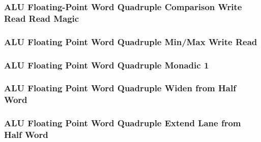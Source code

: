 \subsubsection[{\small ALU Floating-Point Word Quadruple Comparison Write Read Read Magic}]{ALU Floating-Point Word Quadruple Comparison Write Read Read Magic} \label{sec:format-ALU-FWQCWRR.M}



\subsubsection[{\small ALU Floating Point Word Quadruple Min/Max Write Read}]{ALU Floating Point Word Quadruple Min/Max Write Read} \label{sec:format-ALU-FWQMMWR}



\subsubsection[{\small ALU Floating Point Word Quadruple Monadic 1}]{ALU Floating Point Word Quadruple Monadic 1} \label{sec:format-ALU-FWQMO1}



\subsubsection[{\small ALU Floating Point Word Quadruple Widen from Half Word}]{ALU Floating Point Word Quadruple Widen from Half Word} \label{sec:format-ALU-FWQWIDEWR}



\subsubsection[{\small ALU Floating Point Word Quadruple Extend Lane from Half Word}]{ALU Floating Point Word Quadruple Extend Lane from Half Word} \label{sec:format-ALU-FWQEXTLWR}



